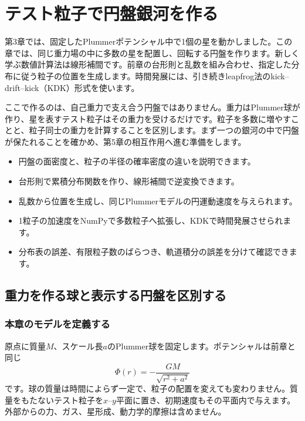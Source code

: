 \chapter{テスト粒子で円盤銀河を作る}
\label{chap:ch4}

第3章では、固定したPlummerポテンシャル中で1個の星を動かしました。この章では、同じ重力場の中に多数の星を配置し、回転する円盤を作ります。新しく学ぶ数値計算法は線形補間です。前章の台形則と乱数を組み合わせ、指定した分布に従う粒子の位置を生成します。時間発展には、引き続きleapfrog法のkick--drift--kick（KDK）形式を使います。

ここで作るのは、自己重力で支え合う円盤ではありません。重力はPlummer球が作り、星を表すテスト粒子はその重力を受けるだけです。粒子を多数に増やすことと、粒子同士の重力を計算することを区別します。まず一つの銀河の中で円盤が保たれることを確かめ、第5章の相互作用へ進む準備をします。

\begin{goalbox}[この章で学ぶこと]
\begin{itemize}
\item 円盤の面密度と、粒子の半径の確率密度の違いを説明できます。
\item 台形則で累積分布関数を作り、線形補間で逆変換できます。
\item 乱数から位置を生成し、同じPlummerモデルの円運動速度を与えられます。
\item 1粒子の加速度をNumPyで多数粒子へ拡張し、KDKで時間発展させられます。
\item 分布表の誤差、有限粒子数のばらつき、軌道積分の誤差を分けて確認できます。
\end{itemize}
\end{goalbox}

\section{重力を作る球と表示する円盤を区別する}
\label{sec:ch4-model}
\subsection{本章のモデルを定義する}
原点に質量$M$、スケール長$a$のPlummer球を固定します。ポテンシャルは前章と同じ
\begin{equation}
\Phi(r)=-\frac{GM}{\sqrt{r^2+a^2}}
\label{eq:ch4-potential}
\end{equation}
です。\cite{bt2008}球の質量は時間によらず一定で、粒子の配置を変えても変わりません。質量をもたないテスト粒子を$x$--$y$平面に置き、初期速度もその平面内で与えます。外部からの力、ガス、星形成、動力学的摩擦は含めません。

